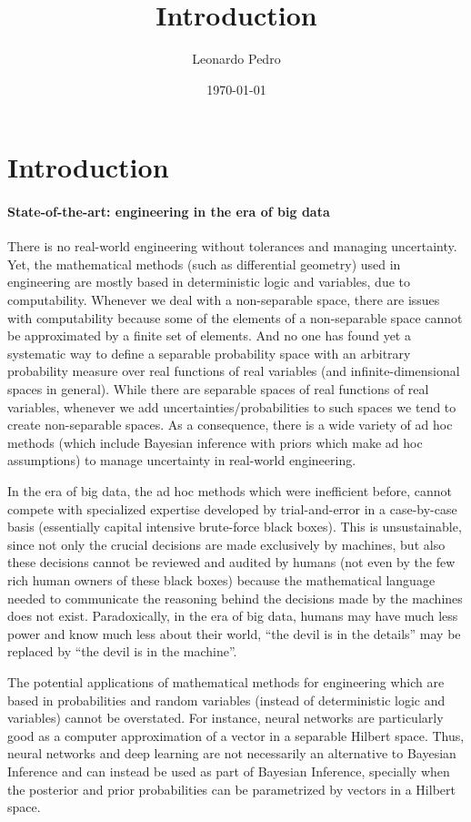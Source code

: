 \documentclass[11pt]{book}
\title{Introduction}
\author{Leonardo Pedro}
\date{\today}
\begin{document}
\tableofcontents
\newpage
\chapter{Introduction}
\hypertarget{state-of-the-art-engineering-in-the-era-of-big-data}{%
\subsubsection{State-of-the-art: engineering in the era of big
data}\label{state-of-the-art-engineering-in-the-era-of-big-data}}

There is no real-world engineering without tolerances and managing
uncertainty. Yet, the mathematical methods (such as differential
geometry) used in engineering are mostly based in deterministic logic
and variables, due to
computability\cite{computable}. Whenever we deal with a non-separable space, there are issues
with computability because some of the elements of a non-separable space
cannot be approximated by a finite set of elements. And no one has found
yet a systematic way to define a separable probability space with an
arbitrary probability measure over real functions of real variables (and
infinite-dimensional spaces in general). While there are separable
spaces of real functions of real variables, whenever we add
uncertainties/probabilities to such spaces we tend to create
non-separable spaces\cite{book}. As a
consequence, there is a wide variety of ad hoc methods (which include
Bayesian inference with priors which make ad hoc assumptions) to manage
uncertainty in real-world engineering.

In the era of big data, the ad hoc methods which were inefficient
before, cannot compete with specialized expertise developed by
trial-and-error in a case-by-case basis (essentially capital intensive
brute-force black boxes). This is unsustainable, since not only the
crucial decisions are made exclusively by machines, but also these
decisions cannot be reviewed and audited by humans (not even by the few
rich human owners of these black boxes) because the mathematical
language needed to communicate the reasoning behind the decisions made
by the machines does not
exist\cite{wachter2017right}\cite{kaminski2019right}.
Paradoxically, in the era of big data, humans may have much less power
and know much less about their world, ``the devil is in the details''
may be replaced by ``the devil is in the machine''.

The potential applications of mathematical methods for engineering which
are based in probabilities and random variables (instead of
deterministic logic and variables) cannot be overstated. For instance,
neural networks are particularly good as a computer approximation of a
vector in a separable Hilbert
space\cite{hornik1989multilayer}. Thus, neural networks and deep learning are not necessarily an
alternative to Bayesian Inference and can instead be used as part of
Bayesian Inference\cite{8955573},
specially when the posterior and prior probabilities can be parametrized
by vectors in a Hilbert space.
\end{document}
